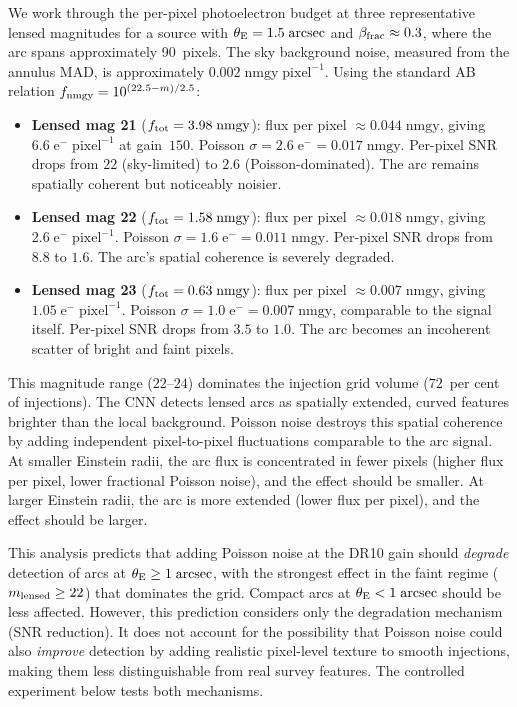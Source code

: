 \documentclass[fleqn,usenatbib]{rasti}
\begin{document}
We work through the per-pixel photoelectron budget at three representative lensed magnitudes for a source with $\theta_{\rm E} = 1.5\;\mathrm{arcsec}$ and $\beta_{\rm frac} \approx 0.3$, where the arc spans approximately 90~pixels.  The sky background noise, measured from the annulus MAD, is approximately $0.002\;\mathrm{nmgy\;pixel^{-1}}$.  Using the standard AB relation $f_{\rm nmgy} = 10^{(22.5 - m)/2.5}$:

\begin{itemize}
\item \textbf{Lensed mag 21} ($f_{\rm tot} = 3.98\;\mathrm{nmgy}$): flux per pixel $\approx 0.044\;\mathrm{nmgy}$, giving $6.6\;\mathrm{e^{-}\;pixel^{-1}}$ at gain~$150$.  Poisson $\sigma = 2.6\;\mathrm{e^{-}} = 0.017\;\mathrm{nmgy}$.  Per-pixel SNR drops from $22$ (sky-limited) to $2.6$ (Poisson-dominated).  The arc remains spatially coherent but noticeably noisier.
\item \textbf{Lensed mag 22} ($f_{\rm tot} = 1.58\;\mathrm{nmgy}$): flux per pixel $\approx 0.018\;\mathrm{nmgy}$, giving $2.6\;\mathrm{e^{-}\;pixel^{-1}}$.  Poisson $\sigma = 1.6\;\mathrm{e^{-}} = 0.011\;\mathrm{nmgy}$.  Per-pixel SNR drops from $8.8$ to $1.6$.  The arc's spatial coherence is severely degraded.
\item \textbf{Lensed mag 23} ($f_{\rm tot} = 0.63\;\mathrm{nmgy}$): flux per pixel $\approx 0.007\;\mathrm{nmgy}$, giving $1.05\;\mathrm{e^{-}\;pixel^{-1}}$.  Poisson $\sigma = 1.0\;\mathrm{e^{-}} = 0.007\;\mathrm{nmgy}$, comparable to the signal itself.  Per-pixel SNR drops from $3.5$ to $1.0$.  The arc becomes an incoherent scatter of bright and faint pixels.
\end{itemize}

This magnitude range ($22$--$24$) dominates the injection grid volume ($72$~per cent of injections).  The CNN detects lensed arcs as spatially extended, curved features brighter than the local background.  Poisson noise destroys this spatial coherence by adding independent pixel-to-pixel fluctuations comparable to the arc signal.  At smaller Einstein radii, the arc flux is concentrated in fewer pixels (higher flux per pixel, lower fractional Poisson noise), and the effect should be smaller.  At larger Einstein radii, the arc is more extended (lower flux per pixel), and the effect should be larger.

This analysis predicts that adding Poisson noise at the DR10 gain should \emph{degrade} detection of arcs at $\theta_{\rm E} \geq 1\;\mathrm{arcsec}$, with the strongest effect in the faint regime ($m_{\rm lensed} \geq 22$) that dominates the grid.  Compact arcs at $\theta_{\rm E} < 1\;\mathrm{arcsec}$ should be less affected.  However, this prediction considers only the degradation mechanism (SNR reduction).  It does not account for the possibility that Poisson noise could also \emph{improve} detection by adding realistic pixel-level texture to smooth injections, making them less distinguishable from real survey features.  The controlled experiment below tests both mechanisms.
\end{document}
